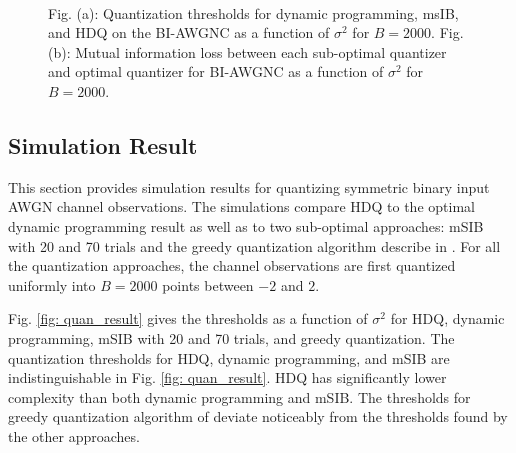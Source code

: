 \documentclass [PhD] {uclathes}
\begin{document}
\begin{figure}[htp] 
    \centering
   \\
  \caption{Fig. (a): Quantization thresholds for dynamic programming, msIB, and HDQ on the BI-AWGNC as a function of $\sigma^2$ for $B=2000$. Fig. (b): Mutual information loss between each sub-optimal quantizer and optimal quantizer for BI-AWGNC as a function of $\sigma^2$ for $B=2000$. }
\end{figure}

\subsection{Simulation Result}
This section provides simulation results for quantizing symmetric binary input AWGN channel observations. The simulations compare HDQ to the optimal dynamic programming result as well as to two sub-optimal approaches: mSIB with 20 and 70 trials and the greedy quantization algorithm describe in \cite{Lewandowsky2018-IBRegular}. For all the quantization approaches, the channel observations are first quantized uniformly into $B=2000$ points between $-2$ and $2$. 

Fig. \ref{fig: quan_result} gives the thresholds as a function of $\sigma^2$ for HDQ, dynamic programming, mSIB with 20 and 70 trials, and  greedy quantization.  The quantization thresholds for HDQ, dynamic programming, and mSIB are indistinguishable in Fig.  \ref{fig: quan_result}.  HDQ has significantly lower complexity than both dynamic programming and mSIB. The thresholds for greedy quantization algorithm of \cite{Tal2011-QuanVardy} deviate noticeably from the thresholds found by the other approaches.
\end{document}
